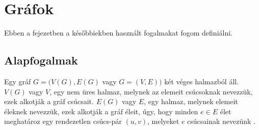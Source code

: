 \chapter{Gráfok}\label{ch:ALAP}

\begin{osszefoglal}
	Ebben a fejezetben a későbbiekben használt fogalmakat fogom definiálni.
	
\end{osszefoglal}

\section{Alapfogalmak}\label{sec:ALAP:adatelem}

Egy gráf \(G = (V(G),E(G)\) vagy \(G = (V,E))\) két véges halmazból áll. \(V(G)\) vagy \(V\), egy nem üres halmaz, melynek az elemeit csúcsoknak nevezzük, ezek alkotják a gráf csúcsait. \(E(G)\) vagy \(E\), egy halmaz, melynek elemeit éleknek nevezzük, ezek alkotják a gráf éleit, úgy, hogy minden \(e \in E\) élet meghatároz egy rendezetlen csúcs-pár \((u,v)\), melyeket \(e\) csúcsainak nevezünk \cite{gt_alg_india}.

